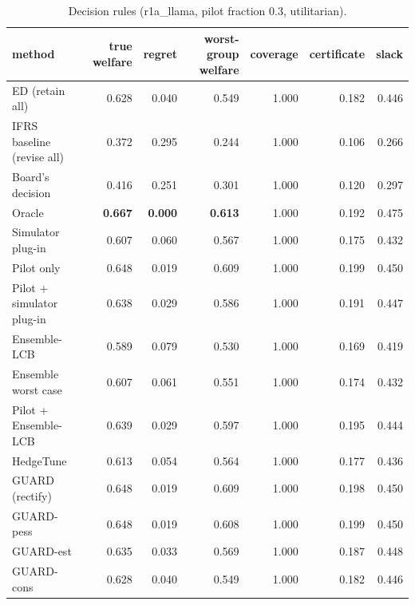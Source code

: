 \begin{table}[t]
\centering
\small
\begin{tabular}{lrrrrrr}
\toprule
method & true welfare & regret & worst-group welfare & coverage & certificate & slack \\
\midrule
ED (retain all) & 0.628 & 0.040 & 0.549 & 1.000 & 0.182 & 0.446 \\
IFRS baseline (revise all) & 0.372 & 0.295 & 0.244 & 1.000 & 0.106 & 0.266 \\
Board's decision & 0.416 & 0.251 & 0.301 & 1.000 & 0.120 & 0.297 \\
Oracle & \textbf{0.667} & \textbf{0.000} & \textbf{0.613} & 1.000 & 0.192 & 0.475 \\
Simulator plug-in & 0.607 & 0.060 & 0.567 & 1.000 & 0.175 & 0.432 \\
Pilot only & 0.648 & 0.019 & 0.609 & 1.000 & 0.199 & 0.450 \\
Pilot + simulator plug-in & 0.638 & 0.029 & 0.586 & 1.000 & 0.191 & 0.447 \\
Ensemble-LCB & 0.589 & 0.079 & 0.530 & 1.000 & 0.169 & 0.419 \\
Ensemble worst case & 0.607 & 0.061 & 0.551 & 1.000 & 0.174 & 0.432 \\
Pilot + Ensemble-LCB & 0.639 & 0.029 & 0.597 & 1.000 & 0.195 & 0.444 \\
HedgeTune & 0.613 & 0.054 & 0.564 & 1.000 & 0.177 & 0.436 \\
GUARD (rectify) & 0.648 & 0.019 & 0.609 & 1.000 & 0.198 & 0.450 \\
GUARD-pess & 0.648 & 0.019 & 0.608 & 1.000 & 0.199 & 0.450 \\
GUARD-est & 0.635 & 0.033 & 0.569 & 1.000 & 0.187 & 0.448 \\
GUARD-cons & 0.628 & 0.040 & 0.549 & 1.000 & 0.182 & 0.446 \\
\bottomrule
\end{tabular}
\caption{Decision rules (r1a\_llama, pilot fraction 0.3, utilitarian).}
\label{tab:methods-utilitarian}
\end{table}

